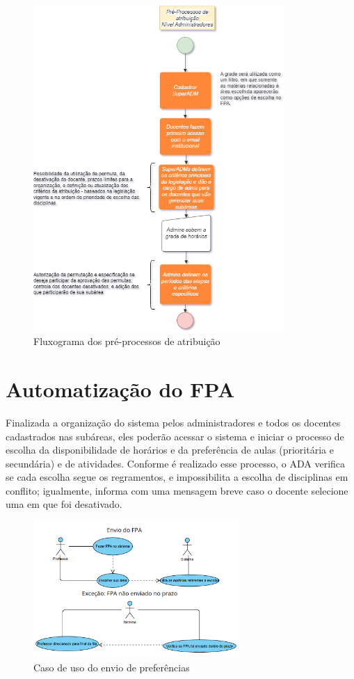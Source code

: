 \begin{figure}[h]
    \centering
    \includegraphics[width=0.85\textwidth]{anexos/Fluxograma/FluxogramaCadastramento.png}
    \caption{Fluxograma dos pré-processos de atribuição}
    \label{fig:figura1} 
\end{figure}

\section{Automatização do FPA}

Finalizada a organização do sistema pelos administradores e todos os docentes cadastrados nas subáreas, eles poderão acessar o sistema e iniciar o processo de escolha da disponibilidade de horários e da preferência de aulas (prioritária e secundária) e de atividades. Conforme é realizado esse processo, o ADA verifica se cada escolha segue os regramentos, e impossibilita a escolha de disciplinas em conflito; igualmente, informa com uma mensagem breve caso o docente selecione uma em que foi desativado. 

\begin{figure}[t]
    \centering
    \includegraphics[width=0.7\textwidth]{anexos/CasosDeUso/CasoDeUso_EnvioFPA.png}
    \caption{Caso de uso do envio de preferências}
    \label{fig:figura2} 
\end{figure}


